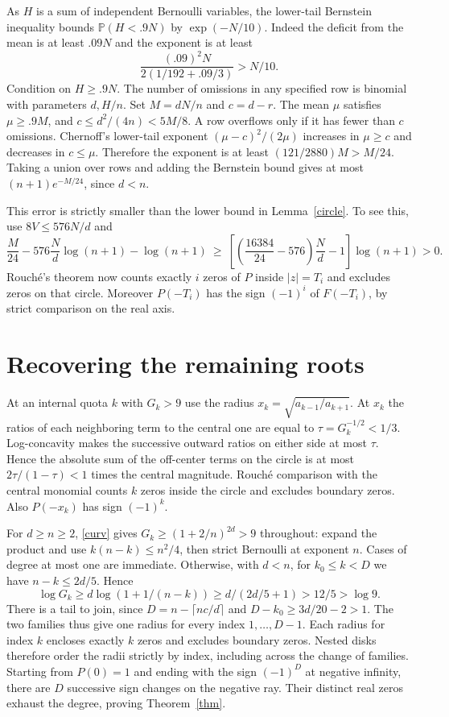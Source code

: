 \documentclass[11pt]{article}
\newcommand{\Prob}{\mathbb P}
\begin{document}
As $H$ is a sum of independent Bernoulli variables, the lower-tail Bernstein inequality bounds $\Prob(H<.9N)$ by $\exp(-N/10)$. Indeed the deficit from the mean is at least $.09N$ and the exponent is at least
\[
 \frac{(.09)^2N}{2(1/192+.09/3)}>N/10 .
\]
Condition on $H\ge .9N$. The number of omissions in any specified row is binomial with parameters $d,H/n$. Set $M=dN/n$ and $c=d-r$. The mean $\mu$ satisfies $\mu\ge.9M$, and $c\le d^2/(4n)<5M/8$. A row overflows only if it has fewer than $c$ omissions. Chernoff's lower-tail exponent $(\mu-c)^2/(2\mu)$ increases in $\mu\ge c$ and decreases in $c\le\mu$. Therefore the exponent is at least $(121/2880)M>M/24$. Taking a union over rows and adding the Bernstein bound gives at most $(n+1)e^{-M/24}$, since $d<n$.

This error is strictly smaller than the lower bound in Lemma~\ref{circle}. To see this, use $8V\le576N/d$ and
\[
 \frac M{24}-576\frac Nd\log(n+1)-\log(n+1)
 \ \ge\ \left[\left(\frac{16384}{24}-576\right)\frac Nd-1\right]\log(n+1)>0 .
\]
Rouch\'e's theorem now counts exactly $i$ zeros of $P$ inside $|z|=T_i$ and excludes zeros on that circle. Moreover $P(-T_i)$ has the sign $(-1)^i$ of $F(-T_i)$, by strict comparison on the real axis.

\section{Recovering the remaining roots}
At an internal quota $k$ with $G_k>9$ use the radius $x_k=\sqrt{a_{k-1}/a_{k+1}}$. At $x_k$ the ratios of each neighboring term to the central one are equal to $\tau=G_k^{-1/2}<1/3$. Log-concavity makes the successive outward ratios on either side at most $\tau$. Hence the absolute sum of the off-center terms on the circle is at most $2\tau/(1-\tau)<1$ times the central magnitude. Rouch\'e comparison with the central monomial counts $k$ zeros inside the circle and excludes boundary zeros. Also $P(-x_k)$ has sign $(-1)^k$.

For $d\ge n\ge2$, \eqref{curv} gives $G_k\ge(1+2/n)^{2d}>9$ throughout: expand the product and use $k(n-k)\le n^2/4$, then strict Bernoulli at exponent $n$. Cases of degree at most one are immediate. Otherwise, with $d<n$, for $k_0\le k<D$ we have $n-k\le 2d/5$. Hence
\[
 \log G_k\ge d\log(1+1/(n-k))\ge d/(2d/5+1)>12/5>\log 9 .
\]
There is a tail to join, since $D=n-\lceil nc/d\rceil$ and $D-k_0\ge3d/20-2>1$. The two families thus give one radius for every index $1,\ldots,D-1$. Each radius for index $k$ encloses exactly $k$ zeros and excludes boundary zeros. Nested disks therefore order the radii strictly by index, including across the change of families. Starting from $P(0)=1$ and ending with the sign $(-1)^D$ at negative infinity, there are $D$ successive sign changes on the negative ray. Their distinct real zeros exhaust the degree, proving Theorem~\ref{thm}.
\end{document}
